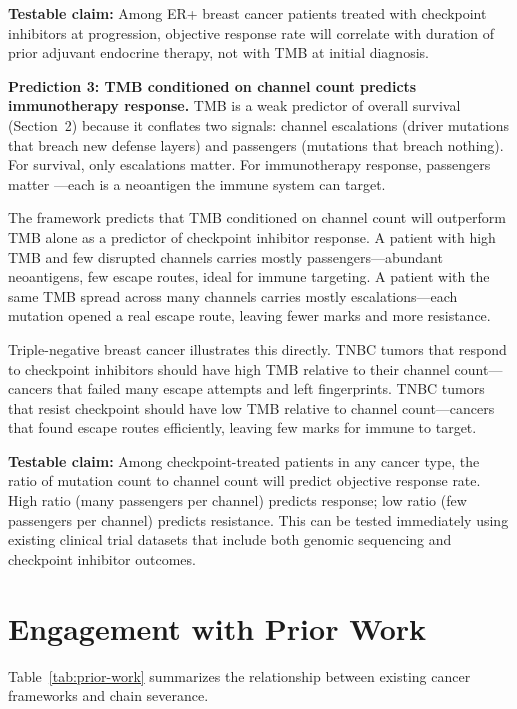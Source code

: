\documentclass[11pt]{article}
\begin{document}
\textbf{Testable claim:} Among ER+ breast cancer patients treated
with checkpoint inhibitors at progression, objective response rate
will correlate with duration of prior adjuvant endocrine therapy,
not with TMB at initial diagnosis.

\textbf{Prediction 3: TMB conditioned on channel count predicts
immunotherapy response.} TMB is a weak predictor of overall
survival (Section~2) because it conflates two signals: channel
escalations (driver mutations that breach new defense layers) and
passengers (mutations that breach nothing). For survival, only
escalations matter. For immunotherapy response, passengers matter
---each is a neoantigen the immune system can target.

The framework predicts that TMB conditioned on channel count will
outperform TMB alone as a predictor of checkpoint inhibitor
response. A patient with high TMB and few disrupted channels
carries mostly passengers---abundant neoantigens, few escape
routes, ideal for immune targeting. A patient with the same TMB
spread across many channels carries mostly escalations---each
mutation opened a real escape route, leaving fewer marks and more
resistance.

Triple-negative breast cancer illustrates this directly. TNBC
tumors that respond to checkpoint inhibitors should have high TMB
relative to their channel count---cancers that failed many escape
attempts and left fingerprints. TNBC tumors that resist checkpoint
should have low TMB relative to channel count---cancers that found
escape routes efficiently, leaving few marks for immune to target.

\textbf{Testable claim:} Among checkpoint-treated patients in any
cancer type, the ratio of mutation count to channel count will
predict objective response rate. High ratio (many passengers per
channel) predicts response; low ratio (few passengers per channel)
predicts resistance. This can be tested immediately using existing
clinical trial datasets that include both genomic sequencing and
checkpoint inhibitor outcomes.

\section{Engagement with Prior Work}
\label{sec:prior}

Table~\ref{tab:prior-work} summarizes the relationship between
existing cancer frameworks and chain severance.
\end{document}
